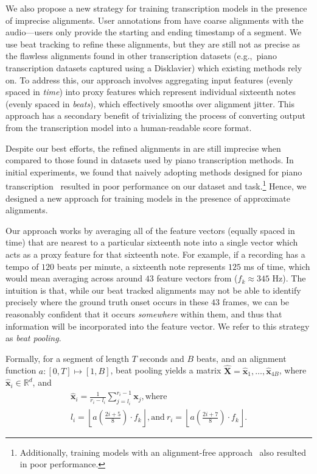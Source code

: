  We also propose a new strategy for training transcription models in the presence of imprecise alignments. 
User annotations from \hooktheory{} have coarse alignments with the audio---users only provide the starting and ending timestamp of a segment. 
We use beat tracking to refine these alignments, but they are still not as precise as the flawless alignments found in other transcription datasets (e.g.,~piano transcription datasets captured using a Disklavier) which existing methods rely on. 
To address this, our approach involves aggregating input features (evenly spaced in \emph{time}) into proxy features which represent individual sixteenth notes (evenly spaced in \emph{beats}), 
which effectively smooths over alignment jitter. 
This approach has a secondary benefit of trivializing the process of converting output from the transcription model into a human-readable score format. %

Despite our best efforts, the refined alignments in \hooktheory{} are still imprecise when compared to those found in datasets used by piano transcription methods. 
In initial experiments, we found that naively adopting methods designed for piano transcription~\cite{hawthorne2017onsets,hawthorne2021sequence} resulted in poor performance on our dataset and task.\footnote{Additionally, training models with an alignment-free approach~\cite{graves2006connectionist} also resulted in poor performance.} 
Hence, we designed a new approach for training models in the presence of approximate alignments. 

Our approach works by averaging all of the feature vectors (equally spaced in time) that are nearest to a particular sixteenth note into a single vector which acts as a proxy feature for that sixteenth note. 
For example, if a recording has a tempo of $120$ beats per minute, a sixteenth note represents $125$ ms of time, which would mean averaging across around $43$ feature vectors from \jukebox{} ($f_k \approx 345$ Hz). 
The intuition is that, while our beat tracked alignments may not be able to identify precisely where the ground truth onset occurs in these $43$ frames, we can be reasonably confident that it occurs \emph{somewhere} within them, and thus that information will be incorporated into the feature vector.
We refer to this strategy as \emph{beat pooling}.

Formally, for a segment of length $T$ seconds and $B$ beats, and an alignment function $a: [0, T] \mapsto [1, B]$, beat pooling yields a matrix $\hat{\bm{X}} = \hat{\bm{x}}_1, \ldots, \hat{\bm{x}}_{4B}$, where $\hat{\bm{x}}_i \in \mathbb{R}^d$, and
\begin{gather*}
\bm{\hat{x}}_i = \frac{1}{r_i - l_i} \sum_{j = l_i}^{r_i - 1} \bm{x}_j, \text{where} \\
l_i = \left\lfloor a \left(\frac{2i + 5}{8} \right) \cdot f_k \right\rfloor, \text{and}~
r_i = \left\lfloor a \left(\frac{2i + 7}{8} \right) \cdot f_k \right\rfloor.
\end{gather*}

